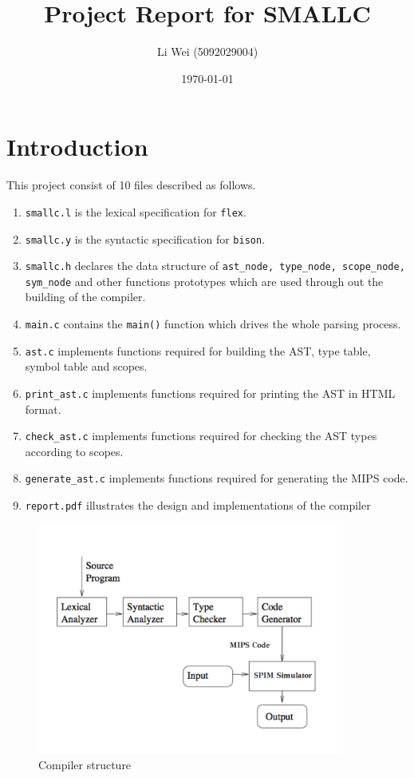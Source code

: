 \documentclass[a4paper]{article}
\title{Project Report for SMALLC}
\author{Li Wei (5092029004)}
\date{\today}
\begin{document}
\maketitle

\section{Introduction}

This project consist of 10 files described as follows.\\
\begin{enumerate}
  \item \texttt{smallc.l} is the lexical specification for \texttt{flex}.
  \item \texttt{smallc.y} is the syntactic specification for \texttt{bison}.
  \item \texttt{smallc.h} declares the data structure of \texttt{ast\_node, type\_node, scope\_node, sym\_node} and other functions prototypes which are used through out the building of the compiler.
  \item \texttt{main.c} contains the \texttt{main()} function which drives the whole parsing process.
  \item \texttt{ast.c} implements functions required for building the AST, type table, symbol table and scopes.
  \item \texttt{print\_ast.c} implements functions required for printing the AST in HTML format.
  \item \texttt{check\_ast.c} implements functions required for checking the AST types according to scopes.
  \item \texttt{generate\_ast.c} implements functions required for generating the MIPS code.
  \item \texttt{report.pdf} illustrates the design and implementations of the compiler
\end{enumerate}

\begin{figure}
  \centering
  \includegraphics[width=0.9\textwidth]{overview}
  \caption{Compiler structure}
  \label{fig:overview}
\end{figure}
\end{document}

